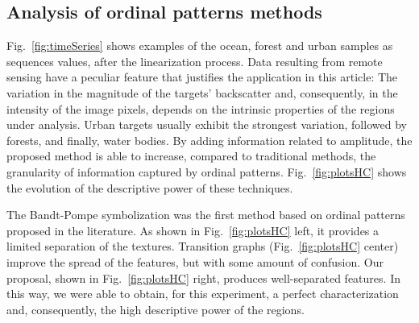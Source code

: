 \documentclass[journal]{IEEEtran}
\begin{document}
	\subsection{Analysis of ordinal patterns methods}
	
	Fig.~\ref{fig:timeSeries} shows examples of the ocean, forest and urban samples as sequences values, after the linearization process.
	Data resulting from remote sensing have a peculiar feature that justifies the application in this article:
	The variation in the magnitude of the targets' backscatter and, consequently, in the intensity of the image pixels, depends on the intrinsic properties of the regions under analysis.
	Urban targets usually exhibit the strongest variation, followed by forests, and finally, water bodies.
	By adding information related to amplitude, the proposed method is able to increase, compared to traditional methods, the granularity of information captured by ordinal patterns.
	Fig.~\ref{fig:plotsHC} shows the evolution of the descriptive power of these techniques.
	
	The Bandt-Pompe symbolization was the first method based on ordinal patterns proposed in the literature.
	As shown in Fig.~\ref{fig:plotsHC} left, it provides a limited separation of the textures.
	Transition graphs (Fig.~\ref{fig:plotsHC} center) improve the spread of the features, but with some amount of confusion.
	Our proposal, shown in Fig.~\ref{fig:plotsHC} right, produces well-separated features.
	In this way, we were able to obtain, for this experiment, a perfect characterization and, consequently, the high descriptive power of the regions.
	
\end{document}
